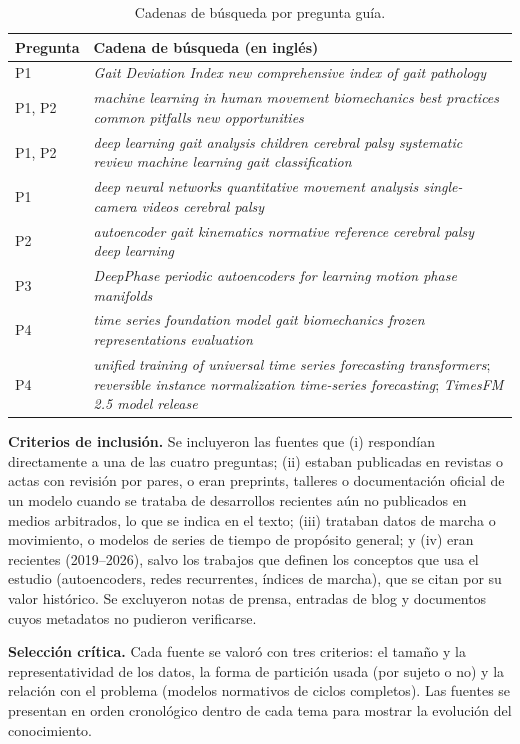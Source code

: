 \documentclass[11pt,a4paper]{article}
\begin{document}
\begin{table}[h]
\centering\small
\begin{tabularx}{\textwidth}{@{}l>{\raggedright\arraybackslash}X@{}}
\toprule
Pregunta & Cadena de búsqueda (en inglés) \\
\midrule
P1 & \textit{Gait Deviation Index new comprehensive index of gait pathology} \\
P1, P2 & \textit{machine learning in human movement biomechanics best practices common pitfalls new opportunities} \\
P1, P2 & \textit{deep learning gait analysis children cerebral palsy systematic review machine learning gait classification} \\
P1 & \textit{deep neural networks quantitative movement analysis single-camera videos cerebral palsy} \\
P2 & \textit{autoencoder gait kinematics normative reference cerebral palsy deep learning} \\
P3 & \textit{DeepPhase periodic autoencoders for learning motion phase manifolds} \\
P4 & \textit{time series foundation model gait biomechanics frozen representations evaluation} \\
P4 & \textit{unified training of universal time series forecasting transformers}; \textit{reversible instance normalization time-series forecasting}; \textit{TimesFM 2.5 model release} \\
\bottomrule
\end{tabularx}
\caption{Cadenas de búsqueda por pregunta guía.}
\label{tab:consultas}
\end{table}

\textbf{Criterios de inclusión.} Se incluyeron las fuentes que (i) respondían directamente a una de las cuatro preguntas; (ii) estaban publicadas en revistas o actas con revisión por pares, o eran preprints, talleres o documentación oficial de un modelo cuando se trataba de desarrollos recientes aún no publicados en medios arbitrados, lo que se indica en el texto; (iii) trataban datos de marcha o movimiento, o modelos de series de tiempo de propósito general; y (iv) eran recientes (2019--2026), salvo los trabajos que definen los conceptos que usa el estudio (autoencoders, redes recurrentes, índices de marcha), que se citan por su valor histórico. Se excluyeron notas de prensa, entradas de blog y documentos cuyos metadatos no pudieron verificarse.

\textbf{Selección crítica.} Cada fuente se valoró con tres criterios: el tamaño y la representatividad de los datos, la forma de partición usada (por sujeto o no) y la relación con el problema (modelos normativos de ciclos completos). Las fuentes se presentan en orden cronológico dentro de cada tema para mostrar la evolución del conocimiento.
\end{document}
